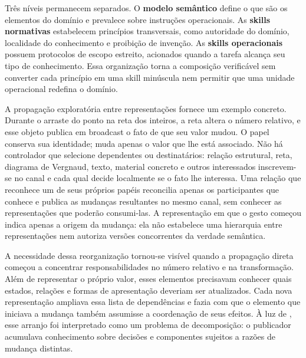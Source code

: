 \documentclass[preprint,12pt,authoryear]{elsarticle}
\begin{document}
Três níveis permanecem separados. O \textbf{modelo semântico} define o que são os elementos do domínio e prevalece sobre instruções operacionais. As \textbf{skills normativas} estabelecem princípios transversais, como autoridade do domínio, localidade do conhecimento e proibição de invenção. As \textbf{skills operacionais} possuem protocolos de escopo estreito, acionados quando a tarefa alcança seu tipo de conhecimento. Essa organização torna a composição verificável sem converter cada princípio em uma skill minúscula nem permitir que uma unidade operacional redefina o domínio.

A propagação exploratória entre representações fornece um exemplo concreto. Durante o arraste do ponto na reta dos inteiros, a reta altera o número relativo, e esse objeto publica em broadcast o fato de que seu valor mudou. O papel conserva sua identidade; muda apenas o valor que lhe está associado. Não há controlador que selecione dependentes ou destinatários: relação estrutural, reta, diagrama de Vergnaud, texto, material concreto e outros interessados inscrevem-se no canal e cada qual decide localmente se o fato lhe interessa. Uma relação que reconhece um de seus próprios papéis reconcilia apenas os participantes que conhece e publica as mudanças resultantes no mesmo canal, sem conhecer as representações que poderão consumi-las. A representação em que o gesto começou indica apenas a origem da mudança: ela não estabelece uma hierarquia entre representações nem autoriza versões concorrentes da verdade semântica.

A necessidade dessa reorganização tornou-se visível quando a propagação direta começou a concentrar responsabilidades no número relativo e na transformação. Além de representar o próprio valor, esses elementos precisavam conhecer quais estados, relações e formas de apresentação deveriam ser atualizados. Cada nova representação ampliava essa lista de dependências e fazia com que o elemento que iniciava a mudança também assumisse a coordenação de seus efeitos. À luz de \citet{parnas1972criteria}, esse arranjo foi interpretado como um problema de decomposição: o publicador acumulava conhecimento sobre decisões e componentes sujeitos a razões de mudança distintas.
\end{document}
